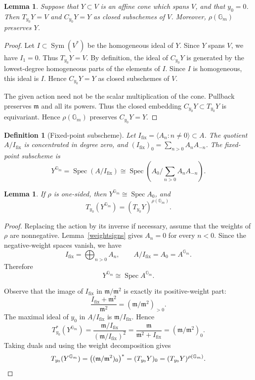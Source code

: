 \documentclass[10pt,a4paper]{amsart}
\newtheorem{lemma}[theorem]{Lemma}
\newtheorem{definition}[theorem]{Definition}
\DeclareMathOperator{\Spec}{Spec}
\DeclareMathOperator{\Sym}{Sym}
\newcommand{\Gm}{\mathbb G_m}
\begin{document}
\begin{lemma}\label{tangentcone}
    Suppose that $Y\subset V$ is an affine cone which spans $V$, and that $y_0=0$. Then $T_{y_0}Y=V$ and $C_{y_0}Y=Y$ as closed subschemes of $V$. Moreover, $\rho(\Gm)$ preserves $Y$.
\end{lemma}
\begin{proof}
    Let $I\subset\Sym(V^*)$ be the homogeneous ideal of $Y$. Since $Y$ spans $V$, we have $I_1=0$. Thus $T_{y_0}Y=V$. By definition, the ideal of $C_{y_0}Y$ is generated by the lowest-degree homogeneous parts of the elements of $I$. Since $I$ is homogeneous, this ideal is $I$. Hence $C_{y_0}Y=Y$ as closed subschemes of $V$.

    The given action need not be the scalar multiplication of the cone. Pullback preserves $\mathfrak m$ and all its powers. Thus the closed embedding $C_{y_0}Y\subset T_{y_0}Y$ is equivariant. Hence $\rho(\Gm)$ preserves $C_{y_0}Y=Y$.
\end{proof}



\begin{definition}[Fixed-point subscheme]\label{fixedsubscheme}
    Let $I_{\mathrm{fix}}=\langle A_n:n\ne0\rangle\subset A$. The quotient $A/I_{\mathrm{fix}}$ is concentrated in degree zero, and $(I_{\mathrm{fix}})_0=\sum_{n>0}A_nA_{-n}$. The \emph{fixed-point subscheme} is
    \[
        Y^{\Gm}=\Spec(A/I_{\mathrm{fix}})
        \cong
        \Spec\left(A_0\Big/\sum_{n>0}A_nA_{-n}\right).
    \]
\end{definition}

\begin{lemma}\label{fixedpoints}
     If $\rho$ is one-sided, then $Y^{\Gm}\cong\Spec A_0$, and
     \[
        T_{y_0}(Y^{\Gm})=(T_{y_0}Y)^{\rho(\Gm)}.
    \]
\end{lemma}
\begin{proof}
    Replacing the action by its inverse if necessary, assume that the weights of $\rho$ are nonnegative. Lemma~\ref{weightsigns} gives $A_n=0$ for every $n<0$.
    Since the negative-weight spaces vanish, we have
    \[
        I_{\mathrm{fix}}=\bigoplus_{n>0}A_n,
        \qquad
        A/I_{\mathrm{fix}}=A_0=A^{\Gm}.
    \]
    Therefore
    \[
        Y^{\Gm}\cong\Spec A^{\Gm}.
    \]

    Observe that the image of $I_{\mathrm{fix}}$ in $\mathfrak m/\mathfrak m^2$ is exactly its positive-weight part:
    \[
        \frac{I_{\mathrm{fix}}+\mathfrak m^2}{\mathfrak m^2}
        =(\mathfrak m/\mathfrak m^2)_{>0}.
    \]
   The maximal ideal of $y_0$ in $A/I_{\mathrm{fix}}$ is $\mathfrak m/I_{\mathrm{fix}}$. Hence
    \[
        T^*_{y_0}(Y^{\Gm})=\frac{\mathfrak m/I_{\mathrm{fix}}}{(\mathfrak m/I_{\mathrm{fix}})^2}=\frac{\mathfrak m}{\mathfrak m^2+I_{\mathrm{fix}}}
        =(\mathfrak m/\mathfrak m^2)_0.
    \]
    Taking duals and using the weight decomposition gives
    \[
        T_{y_0}(Y^{\Gm})
        =\bigl((\mathfrak m/\mathfrak m^2)_0\bigr)^*
        =(T_{y_0}Y)_0
        =(T_{y_0}Y)^{\rho(\Gm)}.\qedhere
    \]
\end{proof}
\end{document}
